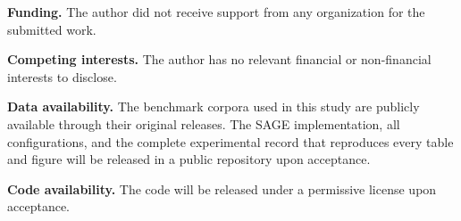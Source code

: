 \documentclass[pdflatex,sn-basic,Numbered]{sn-jnl}
\begin{document}
\noindent\textbf{Funding.}%
The author did not receive support from any organization for the
submitted work.

\smallskip
\noindent\textbf{Competing interests.}%
The author has no relevant financial or non-financial interests to
disclose.

\smallskip
\noindent\textbf{Data availability.}%
The benchmark corpora used in this study are publicly available through
their original releases. The SAGE implementation, all configurations,
and the complete experimental record that reproduces every table and
figure will be released in a public repository upon acceptance.

\smallskip
\noindent\textbf{Code availability.}%
The code will be released under a permissive license upon acceptance.

\begin{appendices}

\setcounter{figure}{8}%
\renewcommand{\thefigure}{\arabic{figure}}%
\setcounter{table}{7}%
\renewcommand{\thetable}{\arabic{table}}%



\end{appendices}

%
\end{document}
